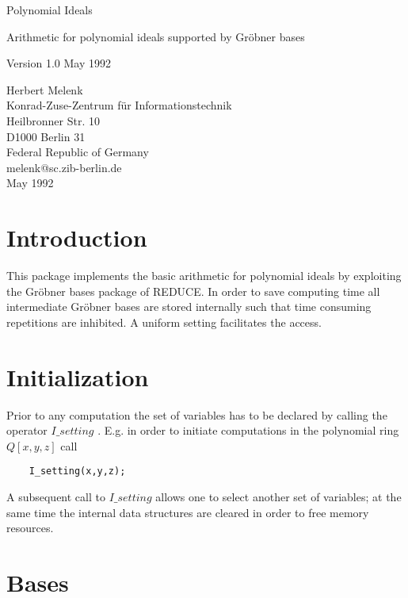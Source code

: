 
\begin{center} {\Large Polynomial Ideals} \end{center}
\begin{center} Arithmetic for polynomial ideals supported by 
Gr\"obner bases \end{center}
\begin{center} Version 1.0 May 1992 \end{center}

\begin{center} Herbert Melenk \\ Konrad-Zuse-Zentrum f\"ur
Informationstechnik \\
Heilbronner Str. 10 \\ D1000 Berlin 31 \\ Federal Republic of Germany \\ 
melenk@sc.zib-berlin.de \\ May 1992 \end{center}

\section{Introduction}

This package implements the basic arithmetic for polynomial ideals
by exploiting the Gr\"obner bases package of REDUCE.
In order to save computing time all intermediate Gr\"obner bases
are stored internally such that time consuming repetitions
are inhibited. A uniform setting facilitates the access.

\section{Initialization}

Prior to any computation the set of variables has to be declared
by calling the operator $I\_setting$ . E.g. in order to initiate
computations in the polynomial ring $Q[x,y,z]$ call
\begin{verbatim}
    I_setting(x,y,z);
\end{verbatim}
A subsequent call to $I\_setting$ allows one to select another set
of variables; at the same time the internal data structures
are cleared in order to free memory resources.

\section{Bases}

